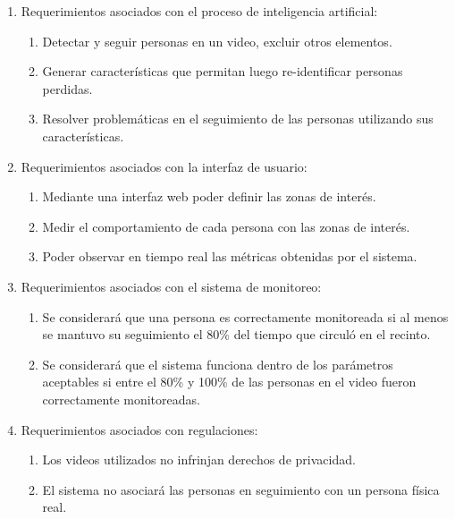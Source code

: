 \begin{enumerate}
\item Requerimientos asociados con el proceso de inteligencia artificial:
	\begin{enumerate}
	\item Detectar y seguir personas en un video, excluir otros elementos.
	\item Generar características que permitan luego re-identificar personas perdidas.
	\item Resolver problemáticas en el seguimiento de las personas utilizando sus características.
	\end{enumerate}
\item Requerimientos asociados con la interfaz de usuario:
	\begin{enumerate}
	\item Mediante una interfaz web poder definir las zonas de interés.
	\item Medir el comportamiento de cada persona con las zonas de interés.
	\item Poder observar en tiempo real las métricas obtenidas por el sistema.
	\end{enumerate}
\item Requerimientos asociados con el sistema de monitoreo:
\begin{enumerate}
	\item Se considerará que una persona es correctamente monitoreada si al menos se mantuvo su seguimiento el 80\% del tiempo que circuló en el recinto.
	\item Se considerará que el sistema funciona dentro de los parámetros aceptables si entre el 80\% y 100\% de las personas en el video fueron correctamente monitoreadas.
	\end{enumerate}
\item Requerimientos asociados con regulaciones:
\begin{enumerate}
	\item Los videos utilizados no infrinjan derechos de privacidad.
	\item El sistema no asociará las personas en seguimiento con un persona física real.
	\end{enumerate}
\end{enumerate}

\newpage


